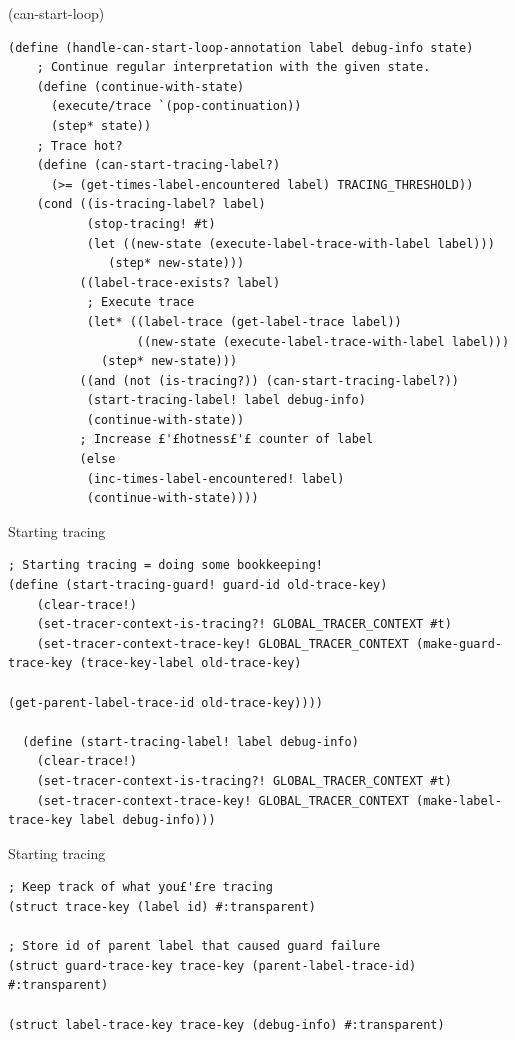 \documentclass{beamer}
\begin{document}
\begin{frame}[fragile]{(can-start-loop)}
\begin{lstlisting}[basicstyle = \tiny\ttfamily, escapechar = £]
  (define (handle-can-start-loop-annotation label debug-info state)
    ; Continue regular interpretation with the given state.
    (define (continue-with-state)
      (execute/trace `(pop-continuation))
      (step* state))
    ; Trace hot?
    (define (can-start-tracing-label?)
      (>= (get-times-label-encountered label) TRACING_THRESHOLD))
    (cond ((is-tracing-label? label)
           (stop-tracing! #t)
      	   (let ((new-state (execute-label-trace-with-label label)))
        	  (step* new-state)))
          ((label-trace-exists? label)
           ; Execute trace
           (let* ((label-trace (get-label-trace label))
                  ((new-state (execute-label-trace-with-label label)))
             (step* new-state)))
          ((and (not (is-tracing?)) (can-start-tracing-label?))
           (start-tracing-label! label debug-info)
           (continue-with-state))
          ; Increase £'£hotness£'£ counter of label
          (else
           (inc-times-label-encountered! label)
           (continue-with-state))))
\end{lstlisting}
\end{frame}

\begin{frame}[fragile]{Starting tracing}
\begin{lstlisting}[basicstyle = \scriptsize\ttfamily, escapechar = £]
; Starting tracing = doing some bookkeeping!
(define (start-tracing-guard! guard-id old-trace-key)
    (clear-trace!)
    (set-tracer-context-is-tracing?! GLOBAL_TRACER_CONTEXT #t)
    (set-tracer-context-trace-key! GLOBAL_TRACER_CONTEXT (make-guard-trace-key (trace-key-label old-trace-key)
                                                                               (get-parent-label-trace-id old-trace-key))))
  
  (define (start-tracing-label! label debug-info)
    (clear-trace!)
    (set-tracer-context-is-tracing?! GLOBAL_TRACER_CONTEXT #t)
    (set-tracer-context-trace-key! GLOBAL_TRACER_CONTEXT (make-label-trace-key label debug-info)))
\end{lstlisting}
\end{frame}

\begin{frame}[fragile]{Starting tracing}

\begin{lstlisting}[basicstyle = \small\ttfamily, escapechar = £]
; Keep track of what you£'£re tracing
(struct trace-key (label id) #:transparent)

; Store id of parent label that caused guard failure
(struct guard-trace-key trace-key (parent-label-trace-id) #:transparent)

(struct label-trace-key trace-key (debug-info) #:transparent)
\end{lstlisting}

\end{frame}
\end{document}
